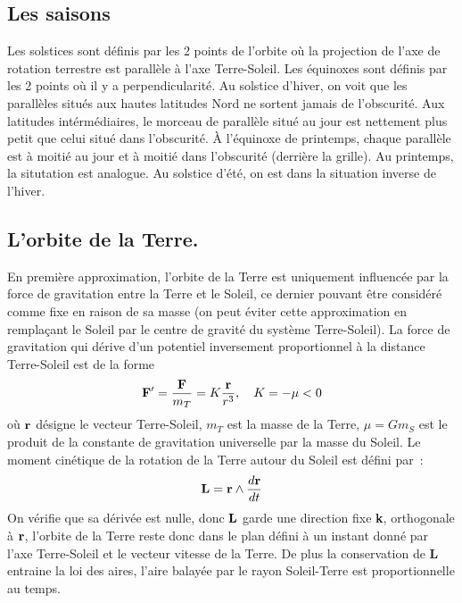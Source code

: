\documentclass[a4paper,11pt]{article}
\begin{document}
\subsection{Les saisons}
Les solstices sont définis par les 2 points de l'orbite où la projection
de l'axe de rotation terrestre est parallèle à l'axe Terre-Soleil.
Les équinoxes sont définis par les 2 points où il y a perpendicularité.
Au solstice d'hiver, on voit que les parallèles situés aux hautes latitudes
Nord ne sortent jamais de l'obscurité. Aux latitudes intérmédiaires,
le morceau de parallèle situé au jour est nettement plus petit que
celui situé dans l'obscurité.
\`A l'équinoxe de printemps, chaque parallèle est à moitié au jour
et à moitié dans l'obscurité (derrière la grille). Au printemps,
la situtation est analogue.
Au solstice d'été, on est dans la situation inverse de l'hiver.

\pagebreak

\subsection{L'orbite de la Terre.}
En première approximation, l'orbite de la Terre est uniquement
influencée par la force de gravitation entre la Terre et le Soleil,
ce dernier pouvant être considéré comme fixe en raison de sa masse
(on peut éviter cette approximation en remplaçant le Soleil par
le centre de gravité du système Terre-Soleil).
La force de gravitation qui dérive d'un potentiel inversement
proportionnel à la distance Terre-Soleil est de la forme
\[ {\bf F'}=\frac{{\bf F}}{m_T}= K \frac{\bf r}{r^3}, \quad K=-\mu<0\]
o\`u ${\bf r}$ d\'esigne le vecteur Terre-Soleil, $m_T$ est la masse
de la Terre, $\mu=Gm_S$ est le produit de la constante
de gravitation universelle par la masse du Soleil.
Le moment cinétique de la rotation de la Terre autour du Soleil
est d\'efini par~:
\[ {\bf L} = {\bf r} \wedge \frac{d \bf r}{dt} \]
On v\'erifie que sa d\'eriv\'ee est nulle, donc ${\bf L}$ garde
une direction fixe {\bf k}, orthogonale \`a ${\bf r}$,
l'orbite de la Terre reste donc dans le plan défini \`a un instant
donn\'e par l'axe Terre-Soleil et le vecteur vitesse de la Terre.
De plus la conservation de {\bf L} entraine 
la loi des aires, l'aire balayée par le rayon Soleil-Terre
est proportionnelle au temps.
\end{document}
